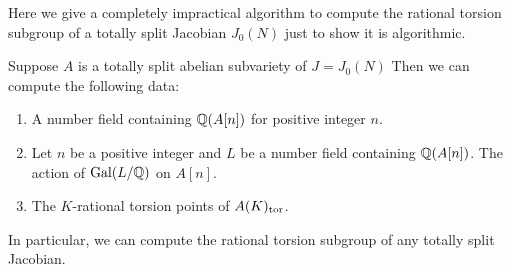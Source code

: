 \documentclass[11pt, proquest]{uwthesis}
\begin{document}
Here we give a completely impractical algorithm to compute the rational torsion
subgroup of a totally split Jacobian $J_0(N)$ just to show it is algorithmic.
\begin{proposition}
    Suppose $A$ is a totally split abelian subvariety of $J=J_0(N)$ Then we can
    compute the following data:
    \begin{enumerate}
        \item
            A number field containing $\mathbb{Q}(A[n])$ for positive integer $n$.
        \item
            Let $n$ be a positive integer and $L$ be a number field containing
            $\mathbb{Q}(A[n])$. The action of $\operatorname{Gal}(L/\mathbb{Q})$ on $A[n]$.
        \item
            The $K$-rational torsion points of $A(K)_{\mathrm{tor}}$.
    \end{enumerate}
    In particular, we can compute the rational torsion subgroup of any totally
    split Jacobian.
\end{proposition}
\end{document}
